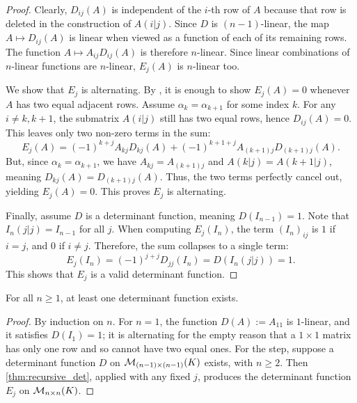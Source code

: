 \begin{proof}
  Clearly, $D_{ij}(A)$ is independent of the $i$-th row of $A$ because that row is deleted in the construction of $A(i|j)$. Since $D$ is $(n-1)$-linear, the map $A \mapsto D_{ij}(A)$ is linear when viewed as a function of each of its remaining rows. The function $A \mapsto A_{ij} D_{ij}(A)$ is therefore $n$-linear. Since linear combinations of $n$-linear functions are $n$-linear, $E_j(A)$ is $n$-linear too.

  We show that $E_j$ is alternating. By , it is enough to show $E_j(A) = 0$ whenever $A$ has two equal adjacent rows.
  Assume $\alpha_k = \alpha_{k+1}$ for some index $k$. For any $i \neq k, k+1$, the submatrix $A(i|j)$ still has two equal rows, hence $D_{ij}(A) = 0$. This leaves only two non-zero terms in the sum:
  \[
  E_j(A) = (-1)^{k+j} A_{kj} D_{kj}(A) + (-1)^{k+1+j} A_{(k+1)j} D_{(k+1)j}(A).
  \] %
  But, since $\alpha_k = \alpha_{k+1}$, we have $A_{kj} = A_{(k+1)j}$ and $A(k|j) = A(k+1|j)$, meaning $D_{kj}(A) = D_{(k+1)j}(A)$. Thus, the two terms perfectly cancel out, yielding $E_j(A) = 0$. This proves $E_j$ is alternating.

  Finally, assume $D$ is a determinant function, meaning $D(I_{n-1}) = 1$. Note that $I_n(j|j) = I_{n-1}$ for all $j$. When computing $E_j(I_n)$, the term $(I_n)_{ij}$ is $1$ if $i=j$, and $0$ if $i \neq j$. Therefore, the sum collapses to a single term:
  \[
  E_j(I_n) = (-1)^{j+j} D_{jj}(I_n) = D(I_n(j|j)) = 1.
  \]
  This shows that $E_j$ is a valid determinant function.
\end{proof}

\begin{corollary}\label{cor:det_exists}
  For all $n \ge 1$, at least one determinant function exists.
\end{corollary}

\begin{proof}
  By induction on $n$. For $n = 1$, the function $D(A) := A_{11}$ is $1$-linear, and it satisfies $D(I_1) = 1$; it is alternating for the empty reason that a $1 \times 1$ matrix has only one row and so cannot have two equal ones. For the step, suppose a determinant function $D$ on $\mathcal{M}_{(n-1) \times (n-1)}(K)$ exists, with $n \ge 2$. Then \cref{thm:recursive_det}, applied with any fixed $j$, produces the determinant function $E_j$ on $\mathcal{M}_{n \times n}(K)$.
\end{proof}

